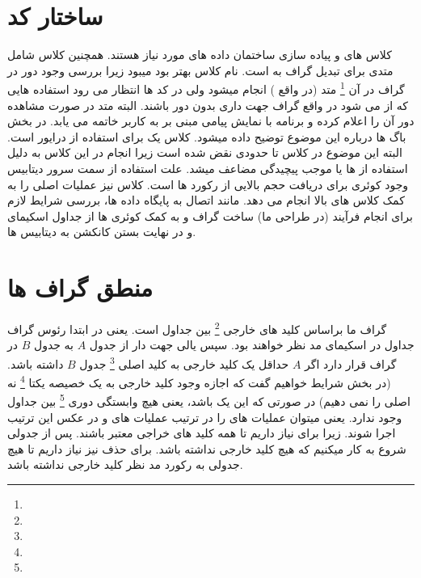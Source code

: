 \documentclass{article}
\begin{document}
\section*{ساختار کد}
کلاس های 
و
پیاده سازی ساختمان داده های مورد نیاز هستند. همچنین کلاس 
شامل متدی برای تبدیل گراف به 
است. نام کلاس 
بهتر بود 
میبود زیرا بررسی وجود دور در گراف در آن
\footnote{}
 متد (در واقع ) انجام میشود ولی در کد ها انتظار می رود استفاده هایی که از 
می شود در واقع گراف جهت داری بدون دور باشند. البته متد 
در صورت مشاهده دور آن را اعلام کرده و برنامه با نمایش پیامی مبنی بر 
 به کاربر خاتمه می یابد. در بخش باگ ها درباره این موضوع توضیح داده میشود. کلاس 
 یک 
 برای استفاده از درایور 
 است. البته این موضوع در کلاس 
 تا حدودی نقض شده است زیرا انجام 
 در این کلاس به دلیل استفاده از
 ها یا 
 موجب پیچیدگی مضاعف میشد. علت استفاده از 
 سمت سرور دیتابیس وجود کوئری برای دریافت حجم بالایی از رکورد ها است. کلاس 
 نیز عملیات اصلی را به کمک کلاس های بالا انجام می دهد. مانند اتصال به پایگاه داده ها، بررسی شرایط لازم برای انجام فرآیند
 (در طراحی ما) ساخت گراف 
 و
 به کمک کوئری ها از جداول اسکیمای 
 و در نهایت بستن کانکشن به دیتابیس ها.
\section*{منطق گراف ها}
گراف 
ما براساس کلید های خارجی 
\footnote{}
بین جداول است. یعنی در ابتدا رئوس گراف جداول در اسکیمای مد نظر خواهند بود. سپس یالی جهت دار از جدول 
 $A$
 به جدول
 $B$
 در گراف قرار دارد اگر 
 $A$
 حداقل یک کلید خارجی به کلید اصلی
 \footnote{}
  جدول 
 $B$ 
 داشته باشد. (در بخش شرایط خواهیم گفت که اجازه وجود کلید خارجی به یک خصیصه یکتا
 \footnote{}
  نه اصلی را نمی دهیم)
  در صورتی که این 
  یک 
  باشد، یعنی هیچ وابستگی دوری
  \footnote{}
   بین جداول وجود ندارد. یعنی میتوان عملیات های 
   را در ترتیب
   عملیات های 
    و
    در عکس این ترتیب اجرا شوند. زیرا برای  نیاز داریم تا همه کلید های خراجی معتبر باشند. پس از جدولی شروع به کار میکنیم که هیچ کلید خارجی نداشته باشد. برای حذف نیز نیاز داریم تا هیچ جدولی به رکورد مد نظر کلید خارجی نداشته باشد. 
    
\end{document}
